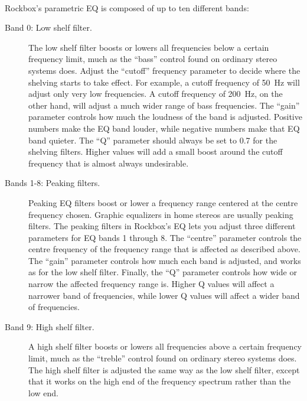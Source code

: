    \\


  Rockbox's parametric EQ is composed of up to ten different bands:
  \begin{description}
  \item[Band 0: Low shelf filter.]
        The low shelf filter boosts or lowers all frequencies below a certain
        frequency limit, much as the ``bass'' control found on ordinary
        stereo systems does.
        Adjust the ``cutoff'' frequency parameter to decide where the shelving
        starts to take effect. For example, a cutoff frequency of 50~Hz will
        adjust only very low frequencies. A cutoff frequency of 200~Hz, on the
        other hand, will adjust a much wider range of bass frequencies.
        The ``gain'' parameter controls how much the loudness of the band is
        adjusted. Positive numbers make the EQ band louder, while negative
        numbers make that EQ band quieter.
        The ``Q'' parameter should always be set to 0.7 for the shelving
        filters. Higher values will add a small boost around the cutoff
        frequency that is almost always undesirable.
  \item[Bands 1-8: Peaking filters.]
        Peaking EQ filters boost or lower a frequency range centered at the
        centre frequency chosen.
        Graphic equalizers in home stereos are usually peaking
        filters. The peaking filters in Rockbox's EQ lets you adjust three
        different parameters for EQ bands 1 through 8. The ``centre'' parameter
        controls the centre frequency of the frequency range that is affected
        as described above.
        The ``gain'' parameter controls how much each band is adjusted, and
        works as for the low shelf filter.
        Finally, the ``Q'' parameter controls how wide or narrow the affected
        frequency range is. Higher Q values will affect a narrower band of
        frequencies, while lower Q values will affect a wider band of
        frequencies.
  \item[Band 9: High shelf filter.]
        A high shelf filter boosts or lowers all frequencies above a certain
        frequency limit, much as the ``treble'' control found on ordinary
        stereo systems does.
        The high shelf filter is adjusted the same way as the low shelf filter,
        except that it works on the high end of the frequency spectrum rather
        than the low end.
  \end{description}
